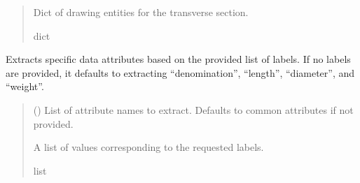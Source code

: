 \documentclass[a4paper,10pt,english]{sphinxmanual}
\begin{document}
\begin{fulllineitems}
\begin{fulllineitems}
\begin{quote}
\begin{description}
\begin{itemize}
\end{itemize}

\sphinxAtStartPar
Dict of drawing entities for the transverse section.

\sphinxAtStartPar
dict

\end{description}\end{quote}

\end{fulllineitems}


\begin{fulllineitems}
\label{\detokenize{API:etacad.bar.Bar.extract_data}}
\pysigstartsignatures
{}
\pysigstopsignatures
\sphinxAtStartPar
Extracts specific data attributes based on the provided list of labels.
If no labels are provided, it defaults to extracting “denomination”, “length”, “diameter”, and “weight”.
\begin{quote}\begin{description}
\sphinxAtStartPar
{} (\sphinxstyleliteralemphasis{\sphinxupquote{{[}}}\sphinxstyleliteralemphasis{\sphinxupquote{{]}}}\sphinxstyleliteralemphasis{\sphinxupquote{, }}) \textendash{} List of attribute names to extract. Defaults to common attributes if not provided.

\sphinxAtStartPar
A list of values corresponding to the requested labels.

\sphinxAtStartPar
list

\end{description}\end{quote}

\end{fulllineitems}


\end{fulllineitems}
\end{document}
